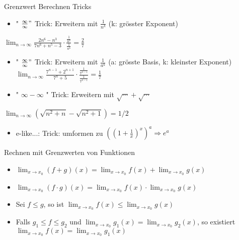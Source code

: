 \begin{KR}{Grenzwert Berechnen Tricks}
    \begin{itemize}
      \item " $\frac{\infty}{\infty} "$ Trick: Erweitern mit $\frac{1}{n^{k}}$ (k: grösster Exponent)
    \end{itemize}
    
    $\lim _{n \rightarrow \infty} \frac{2 n^{6}-n^{3}}{7 n^{6}+n^{5}-3} \cdot \frac{\frac{1}{n^{6}}}{\frac{1}{n^{6}}}=\frac{2}{7}$
    
    \begin{itemize}
      \item " $\frac{\infty}{\infty} "$ Trick: Erweitern mit $\frac{1}{a^{k}}$ (a: grösste Basis, k: kleinster Exponent) $\lim _{n \rightarrow \infty} \frac{7^{n-1}+2^{n+1}}{7^{n}+5} \cdot \frac{\frac{1}{7^{n-1}}}{\frac{1}{7^{n-1}}}=\frac{1}{7}$
      \item " $\infty-\infty$ " Trick: Erweitern mit $\sqrt{\cdots}+\sqrt{\cdots}$
    \end{itemize}
    
    $\lim _{n \rightarrow \infty}\left(\sqrt{n^{2}+n}-\sqrt{n^{2}+1}\right)=1 / 2$
    
    \begin{itemize}
      \item e-like...: Trick: umformen zu $\left(\left(1+\frac{1}{x}\right)^{x}\right)^{a} \Rightarrow e^{a}$
    \end{itemize}
    \end{KR}

    \begin{concept}{Rechnen mit Grenzwerten von Funktionen}
        \begin{itemize}
            \item $\lim_{x \to x_0} (f + g)(x) = \lim_{x \to x_0} f(x) + \lim_{x \to x_0} g(x)$
            \item $\lim_{x \to x_0} (f \cdot g)(x) = \lim_{x \to x_0} f(x) \cdot \lim_{x \to x_0} g(x)$
            \item Sei $f \leq g$, so ist $\lim_{x \to x_0} f(x) \leq \lim_{x \to x_0} g(x)$
            \item Falls $g_1 \leq f \leq g_2$ und $\lim_{x \to x_0} g_1(x) = \lim_{x \to x_0} g_2(x)$, so existiert $\lim_{x \to x_0} f(x) = \lim_{x \to x_0} g_1(x)$
        \end{itemize}
    \end{concept}

